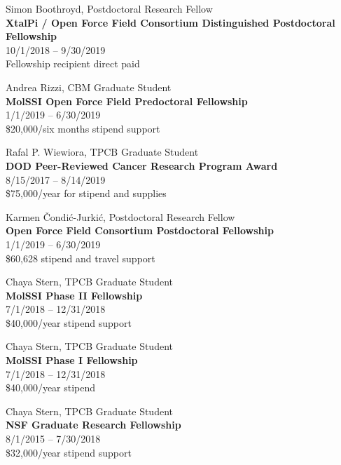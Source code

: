 \documentclass[10pt]{article}
\begin{document}
\vspace{1.5ex}

Simon Boothroyd, Postdoctoral Research Fellow\\
{\bf XtalPi / Open Force Field Consortium Distinguished Postdoctoral Fellowship}\\
10/1/2018 -- 9/30/2019\\
Fellowship recipient direct paid

\vspace{1.5ex}

Andrea Rizzi, CBM Graduate Student\\
{\bf MolSSI Open Force Field Predoctoral Fellowship}\\
1/1/2019 -- 6/30/2019\\
\$20,000/six months stipend support

\vspace{1.5ex}

Rafal P. Wiewiora, TPCB Graduate Student\\
{\bf DOD Peer-Reviewed Cancer Research Program Award}\\
8/15/2017 -- 8/14/2019\\
 \$75,000/year for stipend and supplies

\vspace{1.5ex}

Karmen \v{C}ondi\'{c}-Jurki\'{c}, Postdoctoral Research Fellow\\
{\bf Open Force Field Consortium Postdoctoral Fellowship}\\
1/1/2019 -- 6/30/2019\\
\$60,628 stipend and travel support

\vspace{1.5ex}

Chaya Stern, TPCB Graduate Student\\
{\bf MolSSI Phase II Fellowship}\\
7/1/2018 -- 12/31/2018\\
\$40,000/year stipend support

\vspace{1.5ex}

Chaya Stern, TPCB Graduate Student\\
{\bf MolSSI Phase I Fellowship}\\
7/1/2018 -- 12/31/2018\\
\$40,000/year stipend

\vspace{1.5ex}	

Chaya Stern, TPCB Graduate Student\\
{\bf NSF Graduate Research Fellowship}\\
8/1/2015 -- 7/30/2018\\
\$32,000/year stipend support
\end{document}
